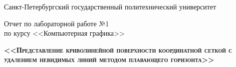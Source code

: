 
\begin{titlepage}

% 
% 
% 
% 
% 
% 
% 
% 
% 
% 

\begin{titlepage}
\newpage

\begin{center}
Санкт-Петербургский государственный политехнический университет
\end{center}

\vspace{13em}

\begin{center}
\Large Отчет по лабораторной работе №1 \\
по курсу <<Компьютерная графика>>
\end{center}

\vspace{2.5em}

\begin{center}
\textsc{\textbf{<<Представление криволинейной поверхности координатной сеткой с удалением невидимых линий методом плавающего горизонта>>}}
\end{center}


\end{titlepage}
\end{titlepage}
